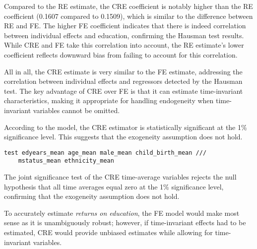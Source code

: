 Compared to the RE estimate, the CRE coefficient is notably higher than the RE coefficient (0.1607 compared to 0.1509), which is similar to the difference between RE and FE. The higher FE coefficient indicates that there is indeed correlation between individual effects and education, confirming the Hausman test results. While CRE and FE take this correlation into account, the RE estimate's lower coefficient reflects downward bias from failing to account for this correlation.

All in all, the CRE estimate is very similar to the FE estimate, addressing the correlation between individual effects and regressors detected by the Hausman test. The key advantage of CRE over FE is that it can estimate time-invariant characteristics, making it appropriate for handling endogeneity when time-invariant variables cannot be omitted.


According to the model, the  CRE estimator is statistically significant at the 1\% significance level. This suggests that the exogeneity assumption does not hold.

\begin{verbatim}
test edyears_mean age_mean male_mean child_birth_mean ///
    mstatus_mean ethnicity_mean
\end{verbatim}


The joint significance test of the CRE time-average variables rejects the null hypothesis that all time averages equal zero at the 1\% significance level, confirming that the exogeneity assumption does not hold.

To accurately estimate \emph{returns on education}, the FE model would make most sense as it is unambiguously robust; however, if time-invariant effects had to be estimated, CRE would provide unbiased estimates while allowing for time-invariant variables.

